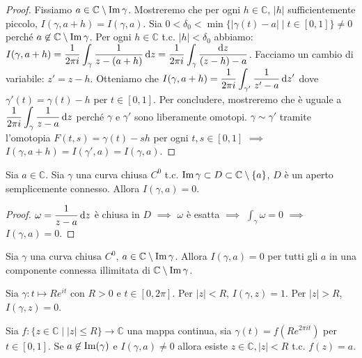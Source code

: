 \begin{proof}
  Fissiamo $a \in \mathbb{C}\setminus\operatorname{Im}{\gamma}$. Mostreremo che per ogni $h \in \mathbb{C}$, $|h|$ sufficientemente piccolo, $I(\gamma, a+h)=I(\gamma, a)$. Sia $0<\delta_0<\min\{|\gamma(t)-a| \mid t \in [0,1]\}\not=0$ perché $a \not \in \mathbb{C}\setminus\operatorname{Im}{\gamma}$.
  Per ogni $h \in \mathbb{C}$ t.c. $|h|<\delta_0$ abbiamo: $\displaystyle I(\gamma, a+h)=\frac{1}{2\pi i}\int_{\gamma} \frac{1}{z-(a+h)}\mathop{}\!\mathrm{d} z=\frac{1}{2\pi i} \int_{\gamma} \frac{\mathop{}\!\mathrm{d} z}{(z-h)-a}$. Facciamo un cambio di variabile: $z'=z-h$.
  Otteniamo che $\displaystyle I(\gamma, a+h)=\frac{1}{2\pi i}\int_{\gamma'} \frac{1}{z'-a}\mathop{}\!\mathrm{d} z'$ dove $\gamma'(t)=\gamma(t)-h$ per $t \in [0,1]$.
  Per concludere, mostreremo che è uguale a $\displaystyle \frac{1}{2\pi i}\int_{\gamma} \frac{1}{z-a}\mathop{}\!\mathrm{d} z$ perché $\gamma$ e $\gamma'$ sono liberamente omotopi. $\gamma \sim \gamma'$ tramite l'omotopia $F(t,s)=\gamma(t)-sh$ per ogni $t,s \in [0,1]$ $\implies$ $I(\gamma, a+h)=I(\gamma', a)=I(\gamma, a)$.
\end{proof}

\begin{prop}
  Sia $a \in \mathbb{C}$. Sia $\gamma$ una curva chiusa $C^0$ t.c. $\operatorname{Im}{\gamma} \subset D \subset \mathbb{C}\setminus\{a\}$, $D$ è un aperto semplicemente connesso. Allora $I(\gamma, a)=0$.
\end{prop}

\begin{proof}
  $\omega=\dfrac{1}{z-a}\mathop{}\!\mathrm{d} z$ è chiusa in $D$ $\implies$ $\omega$ è esatta $\implies$ $\displaystyle \int_{\gamma} \omega=0$ $\implies$ $I(\gamma, a)=0$.
\end{proof}

\begin{exc}
  Sia $\gamma$ una curva chiusa $C^0$, $a \in \mathbb{C}\setminus\operatorname{Im}{\gamma}$. Allora $I(\gamma, a)=0$ per tutti gli $a$ in una componente connessa illimitata di $\mathbb{C}\setminus\operatorname{Im}{\gamma}$.
\end{exc}

\begin{ex}
  Sia $\gamma:t \longmapsto Re^{it}$ con $R>0$ e $t \in [0, 2\pi]$. Per $|z|<R$, $I(\gamma, z)=1$. Per $|z|>R$, $I(\gamma, z)=0$.
\end{ex}

\begin{prop}
  Sia $f:\{z \in \mathbb{C} \mid |z| \le R\} \longrightarrow \mathbb{C}$ una mappa continua, sia $\gamma(t)=f(Re^{2\pi it})$ per $t \in [0,1]$. Se $a \not\in \operatorname{Im}(\gamma)$ e $I(\gamma, a)\not=0$ allora esiste $z \in \mathbb{C}, |z|<R$ t.c. $f(z)=a$.
\end{prop}

